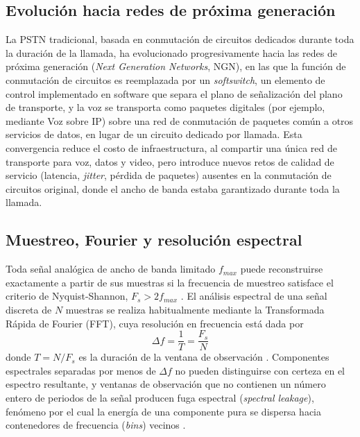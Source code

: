 \documentclass[conference]{IEEEtran}
\begin{document}
\subsection{Evolución hacia redes de próxima generación}

La PSTN tradicional, basada en conmutación de circuitos dedicados durante toda la duración de la llamada, ha evolucionado progresivamente hacia las redes de próxima generación (\textit{Next Generation Networks}, NGN), en las que la función de conmutación de circuitos es reemplazada por un \textit{softswitch}, un elemento de control implementado en software que separa el plano de señalización del plano de transporte, y la voz se transporta como paquetes digitales (por ejemplo, mediante Voz sobre IP) sobre una red de conmutación de paquetes común a otros servicios de datos, en lugar de un circuito dedicado por llamada. Esta convergencia reduce el costo de infraestructura, al compartir una única red de transporte para voz, datos y video, pero introduce nuevos retos de calidad de servicio (latencia, \textit{jitter}, pérdida de paquetes) ausentes en la conmutación de circuitos original, donde el ancho de banda estaba garantizado durante toda la llamada.

\subsection{Muestreo, Fourier y resolución espectral}

Toda señal analógica de ancho de banda limitado $f_{max}$ puede reconstruirse exactamente a partir de sus muestras si la frecuencia de muestreo satisface el criterio de Nyquist-Shannon, $F_s > 2 f_{max}$ \cite{oppenheim}. El análisis espectral de una señal discreta de $N$ muestras se realiza habitualmente mediante la Transformada Rápida de Fourier (FFT), cuya resolución en frecuencia está dada por
\begin{equation}
\Delta f = \frac{1}{T} = \frac{F_s}{N}
\label{eq:resolucion}
\end{equation}
donde $T=N/F_s$ es la duración de la ventana de observación \cite{oppenheim}. Componentes espectrales separadas por menos de $\Delta f$ no pueden distinguirse con certeza en el espectro resultante, y ventanas de observación que no contienen un número entero de periodos de la señal producen fuga espectral (\textit{spectral leakage}), fenómeno por el cual la energía de una componente pura se dispersa hacia contenedores de frecuencia (\textit{bins}) vecinos \cite{proakis}.
\end{document}
